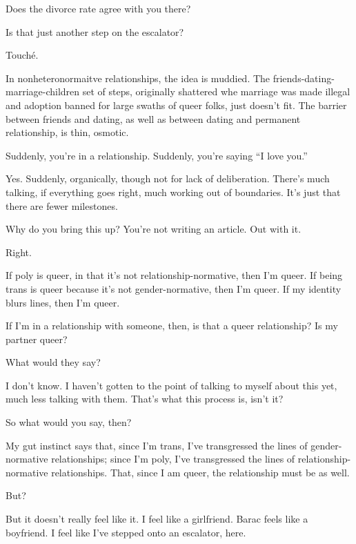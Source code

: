 \begin{paracol}{2}
\begin{leftcolumn}
\begin{ally}
Does the divorce rate agree with you there?
\end{ally}
Is that just another step on the escalator?

\begin{ally}
Touché.
\end{ally}
In nonheteronormaitve relationships, the idea is muddied. The friends-dating-marriage-children set of steps, originally shattered whe marriage was made illegal and adoption banned for large swaths of queer folks, just doesn't fit. The barrier between friends and dating, as well as between dating and permanent relationship, is thin, osmotic.

\begin{ally}
Suddenly, you're in a relationship. Suddenly, you're saying ``I love you.''
\end{ally}
Yes. Suddenly, organically, though not for lack of deliberation. There's much talking, if everything goes right, much working out of boundaries. It's just that there are fewer milestones.

\begin{ally}
Why do you bring this up? You're not writing an article. Out with it.
\end{ally}
Right.
\newpage

\noindent If poly is queer, in that it's not relationship-normative, then I'm queer. If being trans is queer because it's not gender-normative, then I'm queer. If my identity blurs lines, then I'm queer.

If I'm in a relationship with someone, then, is that a queer relationship? Is my partner queer?

\begin{ally}
What would they say?
\end{ally}
I don't know. I haven't gotten to the point of talking to myself about this yet, much less talking with them. That's what this process is, isn't it?

\begin{ally}
So what would you say, then?
\end{ally}
My gut instinct says that, since I'm trans, I've transgressed the lines of gender-normative relationships; since I'm poly, I've transgressed the lines of relationship-normative relationships. That, since I am queer, the relationship must be as well.

\begin{ally}
But?
\end{ally}
But it doesn't really feel like it. I feel like a girlfriend. Barac feels like a boyfriend. I feel like I've stepped onto an escalator, here.


\end{leftcolumn}
\end{paracol}
